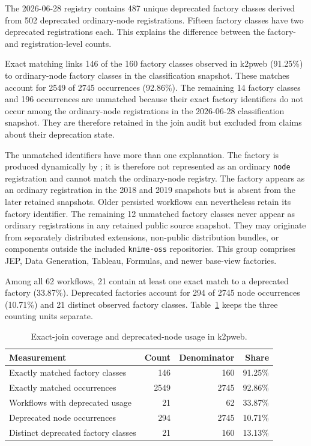 \documentclass[runningheads]{llncs}
\begin{document}
The 2026-06-28 registry contains 487 unique deprecated factory classes derived
from 502 deprecated ordinary-node registrations. Fifteen factory classes have
two deprecated registrations each. This explains the difference between the
factory- and registration-level counts.

Exact matching links 146 of the 160 factory classes observed in k2pweb
(91.25\%) to ordinary-node factory classes in the classification snapshot.
These matches account for 2549 of 2745 occurrences (92.86\%). The remaining 14
factory classes and 196
occurrences are unmatched because their exact factory identifiers do not occur
among the ordinary-node registrations in the 2026-06-28 classification
snapshot. They are therefore retained in the join audit but excluded from
claims about their deprecation state.

The unmatched identifiers have more than one explanation. The factory
 is produced dynamically by
; it is therefore not represented as an ordinary
\texttt{node} registration and cannot match the ordinary-node registry. The
factory
{\scriptsize{}}
appears as an ordinary registration in the 2018 and 2019 snapshots but is absent
from the later retained snapshots. Older persisted workflows can nevertheless
retain its factory identifier. The remaining 12 unmatched factory classes never
appear as ordinary registrations in any retained public source snapshot. They
may originate from separately distributed extensions, non-public distribution
bundles, or components outside the included \texttt{knime-oss} repositories.
This group comprises JEP, Data Generation, Tableau, Formulas, and newer
base-view factories.

Among all 62 workflows, 21 contain at least one exact match to a
deprecated factory (33.87\%). Deprecated factories account for 294 of 2745
node occurrences (10.71\%) and 21 distinct observed factory classes.
Table~\ref{tab:k2pweb-usage} keeps the three counting units separate.

\begin{table}
\centering
\caption{Exact-join coverage and deprecated-node usage in k2pweb.}
\label{tab:k2pweb-usage}
\small
\begin{tabular}{lrrr}
\toprule
Measurement & Count & Denominator & Share \\
\midrule
Exactly matched factory classes & 146 & 160 & 91.25\% \\
Exactly matched occurrences & 2549 & 2745 & 92.86\% \\
Workflows with deprecated usage & 21 & 62 & 33.87\% \\
Deprecated node occurrences & 294 & 2745 & 10.71\% \\
Distinct deprecated factory classes & 21 & 160 & 13.13\% \\
\bottomrule
\end{tabular}
\end{table}
\end{document}
